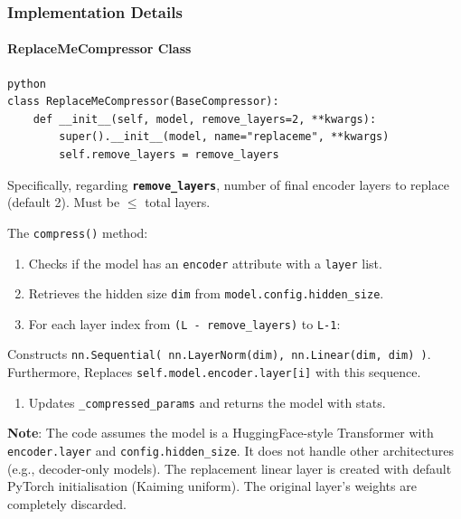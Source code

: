 \subsubsection*{Implementation Details}

\paragraph{ReplaceMeCompressor Class}

\vspace{0.5em}
\begin{mdframed}[backgroundcolor=codebg, linecolor=codeframe, linewidth=1pt, roundcorner=4pt, innerleftmargin=2pt, innerrightmargin=5pt, innertopmargin=5pt, innerbottommargin=5pt]
\begin{lstlisting}
python
class ReplaceMeCompressor(BaseCompressor):
    def __init__(self, model, remove_layers=2, **kwargs):
        super().__init__(model, name="replaceme", **kwargs)
        self.remove_layers = remove_layers
\end{lstlisting}
\end{mdframed}
\vspace{0.5em}

Specifically, regarding \textbf{\texttt{remove\_layers}}, number of final encoder layers to replace (default 2). Must be $\le$ total layers.


The \texttt{compress()} method:

\begin{enumerate}
\item Checks if the model has an \texttt{encoder} attribute with a \texttt{layer} list.
\item Retrieves the hidden size \texttt{dim} from \texttt{model.config.hidden\_size}.
\item For each layer index from \texttt{(L - remove\_layers)} to \texttt{L-1}:
\end{enumerate}
Constructs \texttt{nn.Sequential( nn.LayerNorm(dim), nn.Linear(dim, dim) )}. Furthermore, Replaces \texttt{self.model.encoder.layer[i]} with this sequence.

\begin{enumerate}
\item Updates \texttt{\_compressed\_params} and returns the model with stats.

\end{enumerate}
\textbf{Note}: The code assumes the model is a HuggingFace-style Transformer with \texttt{encoder.layer} and \texttt{config.hidden\_size}. It does not handle other architectures (e.g., decoder-only models). The replacement linear layer is created with default PyTorch initialisation (Kaiming uniform). The original layer's weights are completely discarded.

